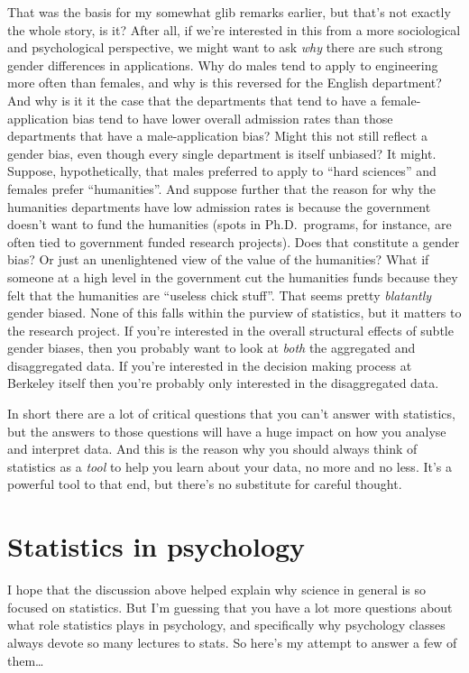 \documentclass[
]{book}
\begin{document}
That was the basis for my somewhat glib remarks earlier, but that's not exactly the whole story, is it? After all, if we're interested in this from a more sociological and psychological perspective, we might want to ask \emph{why} there are such strong gender differences in applications. Why do males tend to apply to engineering more often than females, and why is this reversed for the English department? And why is it it the case that the departments that tend to have a female-application bias tend to have lower overall admission rates than those departments that have a male-application bias? Might this not still reflect a gender bias, even though every single department is itself unbiased? It might.
Suppose, hypothetically, that males preferred to apply to ``hard sciences'' and females prefer ``humanities''. And suppose further that the reason for why the humanities departments have low admission rates is because the government doesn't want to fund the humanities (spots in Ph.D.~programs, for instance, are often tied to government funded research projects). Does that constitute a gender bias? Or just an unenlightened view of the value of the humanities? What if someone at a high level in the government cut the humanities funds because they felt that the humanities are ``useless chick stuff''. That seems pretty \emph{blatantly} gender biased. None of this falls within the purview of statistics, but it matters to the research project. If you're interested in the overall structural effects of subtle gender biases, then you probably want to look at \emph{both} the aggregated and disaggregated data. If you're interested in the decision making process at Berkeley itself then you're probably only interested in the disaggregated data.

In short there are a lot of critical questions that you can't answer with statistics, but the answers to those questions will have a huge impact on how you analyse and interpret data. And this is the reason why you should always think of statistics as a \emph{tool} to help you learn about your data, no more and no less. It's a powerful tool to that end, but there's no substitute for careful thought.

\hypertarget{statistics-in-psychology}{%
\section{Statistics in psychology}\label{statistics-in-psychology}}

I hope that the discussion above helped explain why science in general is so focused on statistics. But I'm guessing that you have a lot more questions about what role statistics plays in psychology, and specifically why psychology classes always devote so many lectures to stats. So here's my attempt to answer a few of them\ldots{}
\end{document}
